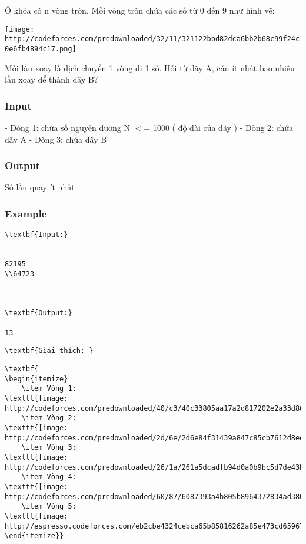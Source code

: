 

Ổ khóa có n vòng tròn. Mỗi vòng tròn chứa các số từ 0 đến 9 như hình vẽ:


\texttt{[image: http://codeforces.com/predownloaded/32/11/321122bbd82dca6bb2b68c99f24c0e6fb4894c17.png]}

Mỗi lần xoay là dịch chuyển 1 vòng đi 1 số. Hỏi từ dãy A, cần ít nhất bao nhiêu lần xoay để thành dãy B? 

\subsubsection{Input}

- Dòng 1: chứa số nguyên dương N $<$= 1000 ( độ dài của dãy )
 - Dòng 2: chứa dãy A
 - Dòng 3: chứa dãy B

\subsubsection{Output}

Số lần quay ít nhất

\subsubsection{Example}
\begin{verbatim}
\textbf{Input:}


82195
\\64723



\textbf{Output:}

13

\end{verbatim}
\begin{verbatim}
\textbf{Giải thích: }\end{verbatim}
\begin{verbatim}
\textbf{
\begin{itemize}
	\item Vòng 1: 
\texttt{[image: http://codeforces.com/predownloaded/40/c3/40c33805aa17a2d817202e2a33d8662abdbb7cda.png]}
	\item Vòng 2: 
\texttt{[image: http://codeforces.com/predownloaded/2d/6e/2d6e84f31439a847c85cb7612d8ee372e6393288.png]}
	\item Vòng 3: 
\texttt{[image: http://codeforces.com/predownloaded/26/1a/261a5dcadfb94d0a0b9bc5d7de43bb036ccfa32c.png]}
	\item Vòng 4: 
\texttt{[image: http://codeforces.com/predownloaded/60/87/6087393a4b805b8964372834ad38016470872ac2.png]}
	\item Vòng 5: 
\texttt{[image: http://espresso.codeforces.com/eb2cbe4324cebca65b85816262a85e473cd65967.png]}
\end{itemize}}\end{verbatim}
